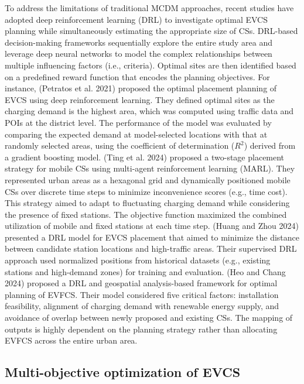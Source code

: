 \documentclass[preprint,12pt]{elsarticle}
\begin{document}
To address the limitations of traditional MCDM approaches, recent studies have adopted deep reinforcement learning (DRL) to investigate optimal EVCS planning while simultaneously estimating the appropriate size of CSs. DRL-based decision-making frameworks sequentially explore the entire study area and leverage deep neural networks to model the complex relationships between multiple influencing factors (i.e., criteria). Optimal sites are then identified based on a predefined reward function that encodes the planning objectives. For instance, (Petratos et al. 2021) \cite{Petratos2021} proposed the optimal placement planning of EVCS using deep reinforcement learning. They defined optimal sites as the charging demand is the highest area, which was computed using traffic data and POIs at the district level. The performance of the model was evaluated by comparing the expected demand at model-selected locations with that at randomly selected areas, using the coefficient of determination ($R^2$) derived from a gradient boosting model. (Ting et al. 2024) \cite{Ting_Lin2024} proposed a two-stage placement strategy for mobile CSs using multi-agent reinforcement learning (MARL). They represented urban areas as a hexagonal grid and dynamically positioned mobile CSs over discrete time steps to minimize inconvenience scores (e.g., time cost). This strategy aimed to adapt to fluctuating charging demand while considering the presence of fixed stations. The objective function maximized the combined utilization of mobile and fixed stations at each time step. (Huang and Zhou 2024) \cite{Huang_zhou2024} presented a DRL model for EVCS placement that aimed to minimize the distance between candidate station locations and high-traffic areas. Their supervised DRL approach used normalized positions from historical datasets (e.g., existing stations and high-demand zones) for training and evaluation. (Heo and Chang 2024) \cite{Heo2024} proposed a DRL and geospatial analysis-based framework for optimal planning of EVFCS. Their model considered five critical factors: installation feasibility, alignment of charging demand with renewable energy supply, and avoidance of overlap between newly proposed and existing CSs. The mapping of outputs is highly dependent on the planning strategy rather than allocating EVFCS across the entire urban area.   

\vspace{0.5cm}

\subsection{Multi-objective optimization of EVCS}
\end{document}

